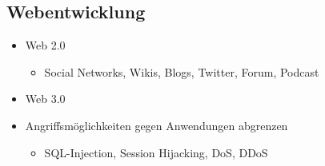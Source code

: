 \subsection{Webentwicklung}
\label{sec:Webentwicklung}

\begin{itemize}
	\item Web 2.0
	\begin{itemize}
		\item Social Networks, Wikis, Blogs, Twitter, Forum, Podcast
	\end{itemize}
	\item Web 3.0
	\item Angriffsmöglichkeiten gegen Anwendungen abgrenzen
	\begin{itemize}
		\item SQL-Injection, Session Hijacking, DoS, DDoS
	\end{itemize}
\end{itemize}